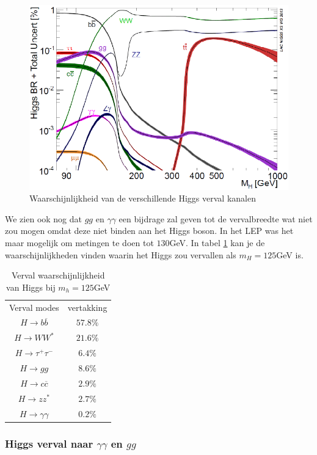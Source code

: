 \documentclass[../main.tex]{subfiles}
\begin{document}
\begin{figure}[h]
    \centering
    \includegraphics[width=0.6\linewidth]{higgs_boson/verval_higgs.png}
    \caption{Waarschijnlijkheid van de verschillende Higgs verval kanalen}%
    \label{fig:higgs_boson/verval_higgs}
\end{figure}

We zien ook nog dat $gg$ en $\gamma\gamma$ een bijdrage zal geven tot de vervalbreedte wat niet zou mogen omdat deze niet binden aan het Higgs boson. In het LEP was het maar mogelijk om metingen te doen tot $130$GeV. In tabel \ref{tab:h_verval_125_gev} kan je de waarschijnlijkheden vinden waarin het Higgs zou vervallen als $m_H=125$GeV is.

\begin{table}[h]
    \centering
    \caption{Verval waarschijnlijkheid van Higgs bij $m_h=125$GeV}
    \label{tab:h_verval_125_gev}
    \begin{tabular}{cc}
        Verval modes & vertakking \\
        $H\rightarrow b\overline b$ & $57.8\%$ \\
        $H\rightarrow WW^*$ & $21.6\%$ \\
        $H\rightarrow \tau^+\tau^-$ & $6.4\%$ \\
        $H\rightarrow gg$ & $8.6\%$ \\
        $H\rightarrow c\overline c$ & $2.9\%$ \\
        $H\rightarrow zz^*$ & $2.7\%$ \\
        $H\rightarrow \gamma\gamma$ & $0.2\%$ \\
    \end{tabular}
\end{table}

\subsubsection{Higgs verval naar $\gamma\gamma$ en $gg$}%
\label{ssub:higgs_verval_naar_gammagamma_en_gg_}
\end{document}
